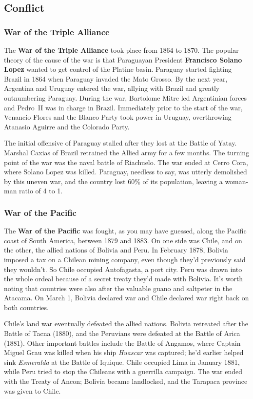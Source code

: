 \subsection*{Conflict}

\subsubsection*{War of the Triple Alliance}

The \textbf{War of the Triple Alliance} took place from 1864 to 1870.
The popular theory of the cause of the war is that Paraguayan President \textbf{Francisco Solano Lopez}
wanted to get control of the Platine basin.
Paraguay started fighting Brazil in 1864 when Paraguay invaded the Mato Grosso.
By the next year, Argentina and Uruguay entered the war,
allying with Brazil and greatly outnumbering Paraguay.
During the war, Bartolome Mitre led Argentinian forces and Pedro~II was in charge in Brazil.
Immediately prior to the start of the war,
Venancio Flores and the Blanco Party took power in Uruguay, overthrowing Atanasio Aguirre and the Colorado Party.

The initial offensive of Paraguay stalled after they lost at the Battle of Yatay.
Marshal Caxias of Brazil retrained the Allied army for a few months.
The turning point of the war was the naval battle of Riachuelo.
The war ended at Cerro Cora, where Solano Lopez was killed.
Paraguay, needless to say, was utterly demolished by this uneven war,
and the country lost 60\% of its population, leaving a woman-man ratio of 4 to 1.

\subsubsection*{War of the Pacific}

The \textbf{War of the Pacific} was fought, as you may have guessed, along the Pacific coast of South America,
between 1879 and 1883.
On one side was Chile, and on the other, the allied nations of Bolivia and Peru.
In February 1878, Bolivia imposed a tax on a Chilean mining company,
even though they'd previously said they wouldn't.
So Chile occupied Antofagasta, a port city.
Peru was drawn into the whole ordeal because of a secret treaty they'd made with Bolivia.
It's worth noting that countries were also after the valuable guano and saltpeter in the Atacama.
On March 1, Bolivia declared war and Chile declared war right back on both countries.

Chile's land war eventually defeated the allied nations.
Bolivia retreated after the Battle of Tacna (1880),
and the Peruvians were defeated at the Battle of Arica (1881).
Other important battles include the Battle of Angamos,
where Captain Miguel Grau was killed when his ship \textit{Huascar} was captured;
he'd earlier helped sink \textit{Esmeralda} at the Battle of Iquique.
Chile occupied Lima in January 1881, while Peru tried to stop the Chileans with a guerrilla campaign.
The war ended with the Treaty of Ancon;
Bolivia became landlocked, and the Tarapaca province was given to Chile.

